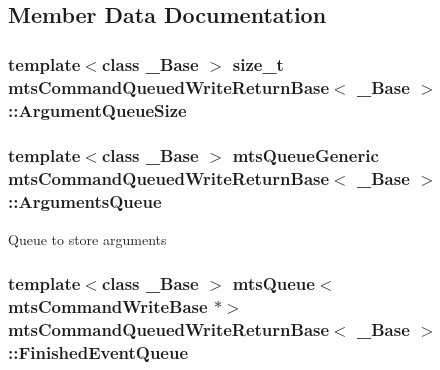 \subsection{Member Data Documentation}
\hypertarget{classmts_command_queued_write_return_base_a3ca30eb9477f0e972799e27948707375}{
\subsubsection[{Argument\-Queue\-Size}]{\setlength{\rightskip}{0pt plus 5cm}template$<$class \-\_\-\-Base $>$ size\-\_\-t {\bf mts\-Command\-Queued\-Write\-Return\-Base}$<$ \-\_\-\-Base $>$\-::Argument\-Queue\-Size\hspace{0.3cm}{\ttfamily [protected]}}}\label{classmts_command_queued_write_return_base_a3ca30eb9477f0e972799e27948707375}
\hypertarget{classmts_command_queued_write_return_base_ac846c793220de2f8b31357230428434f}{
\subsubsection[{Arguments\-Queue}]{\setlength{\rightskip}{0pt plus 5cm}template$<$class \-\_\-\-Base $>$ {\bf mts\-Queue\-Generic} {\bf mts\-Command\-Queued\-Write\-Return\-Base}$<$ \-\_\-\-Base $>$\-::Arguments\-Queue\hspace{0.3cm}{\ttfamily [protected]}}}\label{classmts_command_queued_write_return_base_ac846c793220de2f8b31357230428434f}
Queue to store arguments \hypertarget{classmts_command_queued_write_return_base_aea7fcf280a846a7d73fb7ba81499e858}{
\subsubsection[{Finished\-Event\-Queue}]{\setlength{\rightskip}{0pt plus 5cm}template$<$class \-\_\-\-Base $>$ {\bf mts\-Queue}$<${\bf mts\-Command\-Write\-Base} $\ast$$>$ {\bf mts\-Command\-Queued\-Write\-Return\-Base}$<$ \-\_\-\-Base $>$\-::Finished\-Event\-Queue\hspace{0.3cm}{\ttfamily [protected]}}}\label{classmts_command_queued_write_return_base_aea7fcf280a846a7d73fb7ba81499e858}
